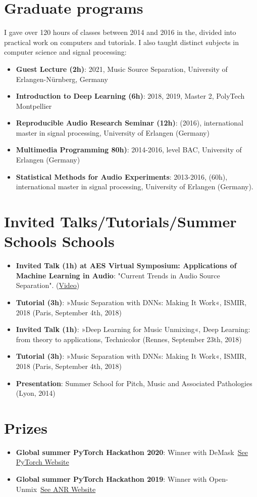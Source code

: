 \documentclass[a4paper,11pt]{article}
\newcommand{\resumeItem}[2]{
  \item\small{
    \textbf{#1}{: #2 \vspace{-2pt}}
  }
}
\newcommand{\resumeSubItem}[2]{\resumeItem{#1}{#2}\vspace{-4pt}}
\newcommand{\resumeSubHeadingListStart}{\begin{itemize}[leftmargin=*]}
\newcommand{\resumeSubHeadingListEnd}{\end{itemize}}
\begin{document}
\section{Graduate programs}
 I gave over 120 hours of classes between 2014 and 2016 in the, divided into practical work on computers and tutorials. I also taught distinct subjects in computer science and signal processing:
\resumeSubHeadingListStart
 \resumeSubItem{Guest Lecture (2h)}{2021, Music Source Separation, University of Erlangen-Nürnberg, Germany}
 \resumeSubItem{Introduction to Deep Learning (6h)}{2018, 2019, Master 2, PolyTech Montpellier}
 \resumeSubItem{Reproducible Audio Research Seminar (12h)}{(2016), international master in signal processing, University of Erlangen (Germany)}
 \resumeSubItem{Multimedia Programming 80h)}{2014-2016, level BAC, University of Erlangen (Germany)}
 \resumeSubItem{Statistical Methods for Audio Experiments}{2013-2016, (60h), international master in signal processing, University of Erlangen (Germany).}
\resumeSubHeadingListEnd

\section{Invited Talks/Tutorials/Summer Schools
Schools}
  \resumeSubHeadingListStart
    \resumeSubItem{Invited Talk (1h) at AES Virtual Symposium: Applications of Machine Learning in Audio}{
         "Current Trends in Audio Source Separation". (\href{https://www.youtube.com/watch?v=AB-F2JmI9U4}{Video})}
    \resumeSubItem{Tutorial (3h)}
    {»Music Separation with DNNs: Making It Work«, ISMIR, 2018 (Paris, September 4th, 2018)}
    \resumeSubItem{Invited Talk (1h)}
    {»Deep Learning for Music Unmixing«, Deep Learning: from
      theory to applications, Technicolor (Rennes, September 23th, 2018)}
    \resumeSubItem{Tutorial (3h)}
    {»Music Separation with DNNs: Making It Work«, ISMIR, 2018 (Paris, September 4th, 2018)}
    \resumeSubItem{Presentation}
    {Summer School for Pitch, Music and Associated Pathologies (Lyon, 2014)}
  \resumeSubHeadingListEnd

\section{Prizes}
\resumeSubHeadingListStart
    \resumeSubItem{Global summer PyTorch Hackathon 2020}
        {Winner with DeMask~\href{https://pytorch.org/blog/announcing-the-winners-of-the-2020-global-pytorch-summer-hackathon/}{See PyTorch Website}}
    \resumeSubItem{Global summer PyTorch Hackathon 2019}
        {Winner with Open-Unmix~\href{https://anr.fr/fr/actualites-de-lanr/details/news/open-unmix-un-logiciel-open-source-issu-du-projet-anr-kamoulox-pour-demixer-la-musique/}{See ANR Website}}
\resumeSubHeadingListEnd
\end{document}
